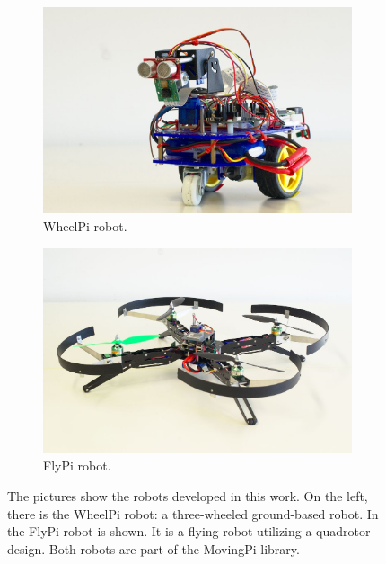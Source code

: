 \begin{figure}
  \centering
  \begin{subfigure}[]{0.475\textwidth}
    \includegraphics[width=1.0\textwidth]{./figures/robot/photos/wheelpi.jpg}
    \caption{WheelPi robot.}
    \label{fig:robot_introduction_photo_wheelpi}
  \end{subfigure}
  \hfill
  \begin{subfigure}[]{0.475\textwidth}
    \includegraphics[width=1.0\textwidth]{./figures/robot/photos/quadcopter.jpg}
    \caption{FlyPi robot.}
    \label{fig:robot_introduction_photo_flypi}
  \end{subfigure}
  \caption{The pictures show the robots developed in this work. On the left, there is the WheelPi robot: a three-wheeled ground-based robot. In  the FlyPi robot is shown. It is a flying robot utilizing a quadrotor design. Both robots are part of the MovingPi library.}
  \label{fig:robot_introduction_photo}
\end{figure}

